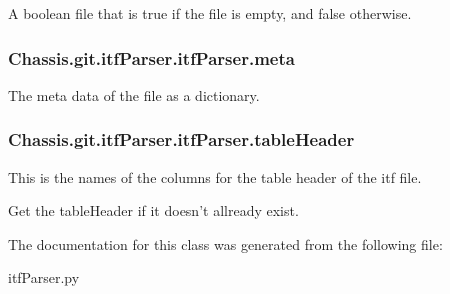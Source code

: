 A boolean file that is true if the file is empty, and false otherwise. 

\hypertarget{class_chassis_8git_1_1itf_parser_1_1itf_parser_aab9e99f0ba1172bdc0a0c2ff59a6ef4e}{
\subsubsection[{meta}]{\setlength{\rightskip}{0pt plus 5cm}Chassis.\-git.\-itf\-Parser.\-itf\-Parser.\-meta}}\label{class_chassis_8git_1_1itf_parser_1_1itf_parser_aab9e99f0ba1172bdc0a0c2ff59a6ef4e}


The meta data of the file as a dictionary. 

\hypertarget{class_chassis_8git_1_1itf_parser_1_1itf_parser_aabe657c777e68a49fc38cfd1fbd39858}{
\subsubsection[{table\-Header}]{\setlength{\rightskip}{0pt plus 5cm}Chassis.\-git.\-itf\-Parser.\-itf\-Parser.\-table\-Header}}\label{class_chassis_8git_1_1itf_parser_1_1itf_parser_aabe657c777e68a49fc38cfd1fbd39858}


This is the names of the columns for the table header of the itf file. 

Get the table\-Header if it doesn't allready exist.

The documentation for this class was generated from the following file\-:\begin{DoxyCompactItemize}
\item 
itf\-Parser.\-py\end{DoxyCompactItemize}
